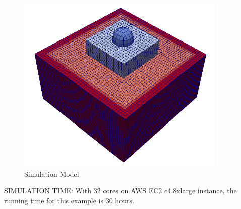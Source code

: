 \begin{figure}[H]
  \centering
  \includegraphics[width = 10cm]{./Figure-files/Day3/Realiastic_Nuclear_Power_Plant_Example_with_Nonlinearities/overview.png}
  \caption{Simulation Model}
  \label{fig_contact_examples3}
\end{figure}



SIMULATION TIME: With 32 cores on AWS EC2 c4.8xlarge instance, the running time for this example is 30 hours.
